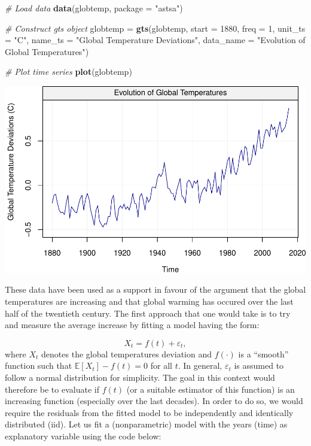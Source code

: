 \documentclass[]{book}
\newenvironment{Shaded}{\begin{snugshade}}{\end{snugshade}}
\newcommand{\KeywordTok}[1]{\textcolor[rgb]{0.13,0.29,0.53}{\textbf{#1}}}
\newcommand{\DataTypeTok}[1]{\textcolor[rgb]{0.13,0.29,0.53}{#1}}
\newcommand{\DecValTok}[1]{\textcolor[rgb]{0.00,0.00,0.81}{#1}}
\newcommand{\StringTok}[1]{\textcolor[rgb]{0.31,0.60,0.02}{#1}}
\newcommand{\CommentTok}[1]{\textcolor[rgb]{0.56,0.35,0.01}{\textit{#1}}}
\newcommand{\NormalTok}[1]{#1}
\theoremstyle{definition}
\theoremstyle{definition}
\theoremstyle{definition}
\theoremstyle{remark}
\begin{document}
\begin{Shaded}
\begin{Highlighting}[]
\CommentTok{# Load data}
\KeywordTok{data}\NormalTok{(globtemp, }\DataTypeTok{package =} \StringTok{"astsa"}\NormalTok{)}

\CommentTok{# Construct gts object}
\NormalTok{globtemp =}\StringTok{ }\KeywordTok{gts}\NormalTok{(globtemp, }\DataTypeTok{start =} \DecValTok{1880}\NormalTok{, }\DataTypeTok{freq =} \DecValTok{1}\NormalTok{, }\DataTypeTok{unit_ts =} \StringTok{"C"}\NormalTok{, }\DataTypeTok{name_ts =} \StringTok{"Global Temperature Deviations"}\NormalTok{, }\DataTypeTok{data_name =} \StringTok{"Evolution of Global Temperatures"}\NormalTok{)}

\CommentTok{# Plot time series}
\KeywordTok{plot}\NormalTok{(globtemp)}
\end{Highlighting}
\end{Shaded}

\begin{center}\includegraphics{ts_files/figure-latex/glotempExample-1} \end{center}

These data have been used as a support in favour of the argument that
the global temperatures are increasing and that global warming has
occured over the last half of the twentieth century. The first approach
that one would take is to try and measure the average increase by
fitting a model having the form:

\[
X_t = f(t) + \varepsilon_t,
\] where \(X_t\) denotes the global temperatures deviation and
\(f(\cdot)\) is a ``smooth'' function such that
\(\mathbb{E}[X_t] - f(t) = 0\) for all \(t\). In general,
\(\varepsilon_t\) is assumed to follow a normal distribution for
simplicity. The goal in this context would therefore be to evaluate if
\(f(t)\) (or a suitable estimator of this function) is an increasing
function (especially over the last decades). In order to do so, we would
require the residuals from the fitted model to be independently and
identically distributed (iid). Let us fit a (nonparametric) model with
the years (time) as explanatory variable using the code below:
\end{document}
